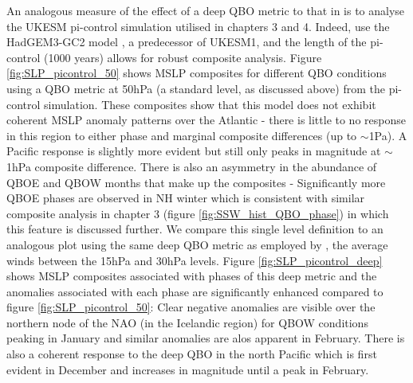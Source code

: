 An analogous measure of the effect of a deep QBO metric to that in \cite{andrewsObserved2019d} is to analyse the UKESM pi-control simulation utilised in chapters 3 and 4. Indeed, \cite{andrewsObserved2019d} use the HadGEM3-GC2 model \citep{williamsMet2018b}, a predecessor of UKESM1, and the length of the pi-control (1000 years) allows for robust composite analysis. Figure \ref{fig:SLP_picontrol_50} shows MSLP composites for different QBO conditions using a QBO metric at 50hPa (a standard level, as discussed above) from the pi-control simulation. These composites show that this model does not exhibit coherent MSLP anomaly patterns over the Atlantic - there is little to no response in this region to either phase and marginal composite differences (up to $\sim$1Pa). A Pacific response is slightly more evident but still only peaks in magnitude at $\sim$1hPa composite difference. There is also an asymmetry in the abundance of QBOE and QBOW months that make up the composites - Significantly more QBOE phases are observed in NH winter which is consistent with similar composite analysis in chapter 3 (figure \ref{fig:SSW_hist_QBO_phase}) in which this feature is discussed further. We compare this single level definition to an analogous plot using the same deep QBO metric as employed by \cite{andrewsObserved2019d}, the average winds between the 15hPa and 30hPa levels. Figure \ref{fig:SLP_picontrol_deep} shows MSLP composites associated with phases of this deep metric and the anomalies associated with each phase are significantly enhanced compared to figure \ref{fig:SLP_picontrol_50}: Clear negative anomalies are visible over the northern node of the NAO (in the Icelandic region) for QBOW conditions peaking in January and similar anomalies are alos apparent in February. There is also a coherent response to the deep QBO in the north Pacific which is first evident in December and increases in magnitude until a peak in February.

